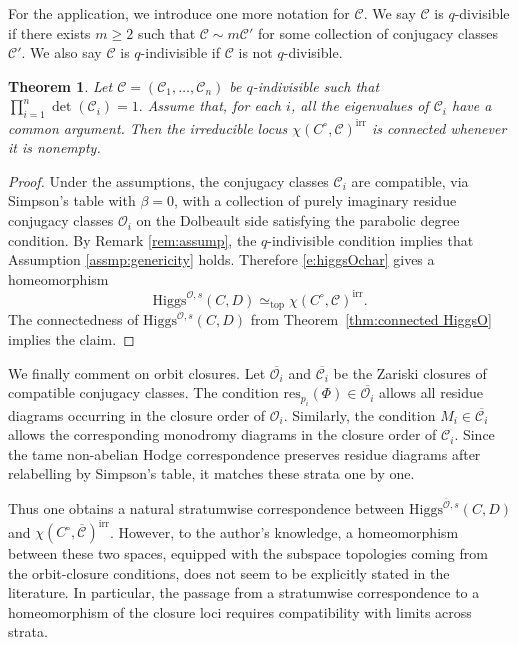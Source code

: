 \documentclass[11pt]{amsart}
\theoremstyle{plain}
\newtheorem{theorem}{Theorem}[section]
\theoremstyle{definition}
\theoremstyle{remark}
\newcommand{\cO}{\mathcal O}
\newcommand{\Higgs}{\mathrm{Higgs}}
\def\res{\mathrm{res}}
\begin{document}
For the application, we introduce one more notation for $\mathcal{C}$. We say $\mathcal{C}$ is $q$-divisible if there exists $m \geq 2$ such that $\mathcal{C} \sim m\mathcal{C}'$ for some collection of conjugacy classes $\mathcal{C}'$. We also say $\mathcal{C}$ is $q$-indivisible if $\mathcal{C}$ is not $q$-divisible. 

\begin{theorem}\label{thm:connected-character-variety}
	Let $\mathcal C=(\mathcal C_1,\ldots,\mathcal C_n)$ be $q$-indivisible such that $\prod_{i=1}^n\det(\mathcal C_i)=1.$ Assume that, for each $i$, all the eigenvalues of $\mathcal C_i$ have a common argument. Then the irreducible locus
	$\chi(C^\circ,\mathcal C)^{\operatorname{irr}}$
	is connected whenever it is nonempty. 
\end{theorem}


\begin{proof}
	Under the assumptions, the conjugacy classes $\mathcal C_i$ are compatible, via Simpson's table with $\beta=0$, with a collection of purely imaginary residue conjugacy classes $\cO_i$ on the Dolbeault side satisfying the parabolic degree condition. By Remark \ref{rem:assump}, the $q$-indivisible condition implies that Assumption \ref{assmp:genericity} holds. Therefore \eqref{e:higgsOchar} gives a homeomorphism
	\[
	\Higgs^{\cO,s}(C,D)\simeq_{\mathrm{top}}
	\chi(C^\circ,\mathcal C)^{\operatorname{irr}}.
	\]
	The connectedness of $\Higgs^{\cO,s}(C,D)$ from Theorem~\ref{thm:connected HiggsO} implies the claim.
\end{proof}


We finally comment on orbit closures. Let $\overline{\cO_i}$ and $\overline{\mathcal C_i}$ be the Zariski closures of compatible conjugacy classes. The condition $\res_{p_i}(\Phi)\in\overline{\cO_i}$ allows all residue diagrams occurring in the closure order of $\cO_i$. Similarly, the condition $M_i\in\overline{\mathcal C_i}$ allows the corresponding monodromy diagrams in the closure order of $\mathcal C_i$. Since the tame non-abelian Hodge correspondence preserves residue diagrams after relabelling by Simpson's table, it matches these strata one by one.

Thus one obtains a natural stratumwise correspondence between $\Higgs^{\overline{\cO},s}(C,D)$ and $\chi(C^\circ,\overline{\mathcal C})^{\mathrm{irr}}$. However, to the author's knowledge, a homeomorphism between these two spaces, equipped with the subspace topologies coming from the orbit-closure conditions, does not seem to be explicitly stated in the literature. In particular, the passage from a stratumwise correspondence to a homeomorphism of the closure loci requires compatibility with limits across strata.
\end{document}
